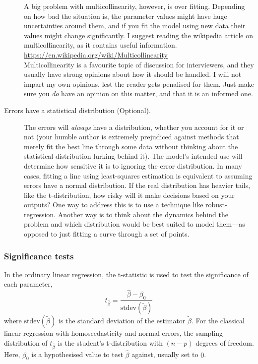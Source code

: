 \documentclass[a4paper]{article}
\begin{document}
\begin{description}
  A big problem with multicollinearity, however, is over fitting.
  Depending on how bad the situation is, the parameter values might have huge uncertainties around them, and if you fit the model using new data their values might change significantly.
  I suggest reading the wikipedia article on multicollinearity, as it contains useful information. \\
  \url{https://en.wikipedia.org/wiki/Multicollinearity} \\
  Multicollinearity is a favourite topic of discussion for interviewers, and they usually have strong opinions about how it should be handled.
  I will not impart my own opinions, lest the reader gets penalised for them.
  Just make sure you \emph{do} have an opinion on this matter, and that it is an informed one.
  \item[Errors have a statistical distribution (Optional).] The errors will \emph{always} have a distribution, whether you account for it or not (your humble author is extremely prejudiced against methods that merely fit the best line through some data without thinking about the statistical distribution lurking behind it).
  The model's intended use will determine how sensitive it is to ignoring the error distribution.
  In many cases, fitting a line using least-squares estimation is equivalent to assuming errors have a normal distribution.
  If the real distribution has heavier tails, like the t-distribution, how risky will it make decisions based on your outputs?
  One way to address this is to use a technique like robust-regression.
  Another way is to think about the dynamics behind the problem and which distribution would be best suited to model them---as opposed to just fitting a curve through a set of points.
\end{description}

\subsubsection{Significance tests}
In the ordinary linear regression, the t-statistic is used to test the significance of each parameter,
\[
t_{\hat\beta}  =  \frac{\hat\beta - \beta_0}{ \text{stdev}( \tilde\beta) }
\]
where
${\text{stdev}( \tilde\beta)}$
is the standard deviation of the estimator
$\tilde\beta$.
For the classical linear regression with homoscedasticity and normal errors,
the sampling distribution of
$t_{\hat\beta}$
is the student's t-distribution with $(n-p)$ degrees of freedom.
Here, $\beta_0$ is a hypothesised value to test $\hat\beta$ against, usually set to $0$.
\end{document}
